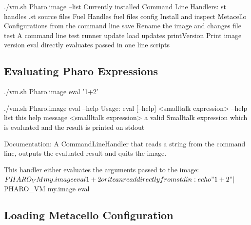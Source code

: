 \documentclass[a4paper,10pt,twoside]{book}
\begin{document}


\begin{code}{}
./vm.sh Pharo.image --list
Currently installed Command Line Handlers:
    st              handles .st source files
    Fuel            Handles fuel files
    config          Install and inspect Metacello Configurations from the command line
    save            Rename the image and changes file
    test            A command line test runner
    update          load updates
    printVersion    Print image version
    eval            directly evaluates passed in one line scripts
\end{code}    
    

\subsection{Evaluating Pharo Expressions}

\begin{code}{}
./vm.sh Pharo.image eval '1+2'
\end{code}


\begin{code}{}
./vm.sh Pharo.image eval --help 
Usage: eval [--help] <smalltalk expression>
	--help    list this help message
	<smallltalk expression>  a valid Smalltalk expression which is evaluated and 
	                         the result is printed on stdout

Documentation:
A CommandLineHandler that reads a string from the command line, outputs the evaluated result and quits the image. 

This handler either evaluates the arguments passed to the image:
	$PHARO_VM my.image eval  1 + 2
	
or it can read directly from stdin:

	echo "1+2" | $PHARO_VM my.image eval 
\end{code}


\subsection{Loading Metacello Configuration}
\end{document}
